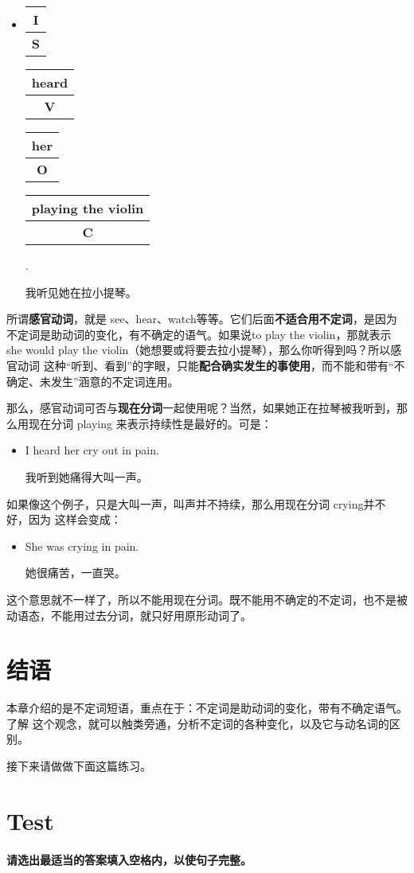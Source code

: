 \documentclass{yufa}
\makeatletter
\newcommand\unct[2]{\def\arraystretch{0.8}
  {\setlength{\tabcolsep}{0pt}
    \begin{tabular}[t]{@{}c@{}} \setlength\arrayrulewidth{0.8pt} \textbf{#1}\\\hline \textbf{\small #2} \\\end{tabular}}}
\makeatother
\begin{document}
\begin{itemize}
\item \unct{I}{S} \unct{heard}{V} \unct{her}{O} \unct{playing the violin}{C}.

  我听见她在拉小提琴。
\end{itemize}

所谓\textbf{感官动词}，就是 see、hear、watch等等。它们后面\textbf{不适合用不定词}，是因为
不定词是助动词的变化，有不确定的语气。如果说to play the violin，那就表示 she
would play the violin（她想要或将要去拉小提琴），那么你听得到吗？所以感官动词
这种“听到、看到”的字眼，只能\textbf{配合确实发生的事使用}，而不能和带有“不
确定、未发生”涵意的不定词连用。

那么，感官动词可否与\textbf{现在分词}一起使用呢？当然，如果她正在拉琴被我听到，那么用现在分词
playing 来表示持续性是最好的。可是：
\begin{itemize}
\item  I heard her cry out in pain.

  我听到她痛得大叫一声。
\end{itemize}

如果像这个例子，只是大叫一声，叫声并不持续，那么用现在分词 crying并不好，因为
这样会变成：
\begin{itemize}
\item She was crying in pain.

  她很痛苦，一直哭。
\end{itemize}
这个意思就不一样了，所以不能用现在分词。既不能用不确定的不定词，也不是被动语态，不能用过去分词，就只好用原形动词了。

\section{结语}

本章介绍的是不定词短语，重点在于：不定词是助动词的变化，带有不确定语气。了解
这个观念，就可以触类旁通，分析不定词的各种变化，以及它与动名词的区别。

接下来请做做下面这篇练习。

\section{Test}

\paragraph{请选出最适当的答案填入空格内，以使句子完整。}
\end{document}
